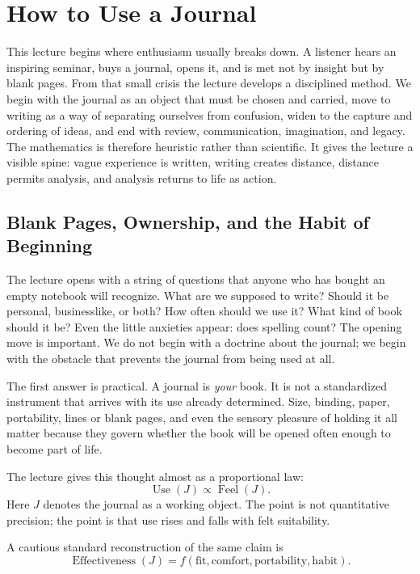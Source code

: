 \chapter{How to Use a Journal}

This lecture begins where enthusiasm usually breaks down. A listener hears an inspiring seminar, buys a journal, opens it, and is met not by insight but by blank pages. From that small crisis the lecture develops a disciplined method. We begin with the journal as an object that must be chosen and carried, move to writing as a way of separating ourselves from confusion, widen to the capture and ordering of ideas, and end with review, communication, imagination, and legacy. The mathematics is therefore heuristic rather than scientific. It gives the lecture a visible spine: vague experience is written, writing creates distance, distance permits analysis, and analysis returns to life as action.

\section{Blank Pages, Ownership, and the Habit of Beginning}

The lecture opens with a string of questions that anyone who has bought an empty notebook will recognize. What are we supposed to write? Should it be personal, businesslike, or both? How often should we use it? What kind of book should it be? Even the little anxieties appear: does spelling count? The opening move is important. We do not begin with a doctrine about the journal; we begin with the obstacle that prevents the journal from being used at all.

The first answer is practical. A journal is \emph{your} book. It is not a standardized instrument that arrives with its use already determined. Size, binding, paper, portability, lines or blank pages, and even the sensory pleasure of holding it all matter because they govern whether the book will be opened often enough to become part of life.

The lecture gives this thought almost as a proportional law:
\begin{equation}
\operatorname{Use}(J)\propto \operatorname{Feel}(J).
\end{equation}
Here \(J\) denotes the journal as a working object. The point is not quantitative precision; the point is that use rises and falls with felt suitability.

A cautious standard reconstruction of the same claim is
\begin{equation}
\operatorname{Effectiveness}(J)=f(\text{fit},\text{comfort},\text{portability},\text{habit}).
\end{equation}


